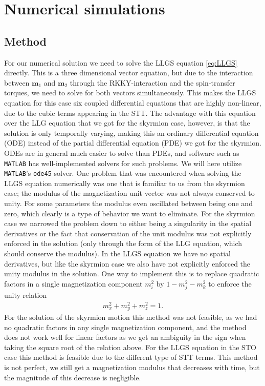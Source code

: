 \section{Numerical simulations}
\subsection{Method}
For our numerical solution we need to solve the LLGS equation \eqref{eq:LLGS} directly. This is a three dimensional vector equation, but due to the interaction between $\mathbold{m}_1$ and $\mathbold{m}_2$ through the RKKY-interaction and the spin-transfer torques, we need to solve for both vectors simultaneously. This makes the LLGS equation for this case six coupled differential equations that are highly non-linear, due to the cubic terms appearing in the STT. The advantage with this equation over the LLG equation that we got for the skyrmion case, however, is that the solution is only temporally varying, making this an ordinary differential equation (ODE) instead of the partial differential equation (PDE) we got for the skyrmion. ODEs are in general much easier to solve than PDEs, and software such as \texttt{MATLAB} has well-implemented solvers for such problems. We will here utilize \texttt{MATLAB}'s \texttt{ode45} solver. One problem that was encountered when solving the LLGS equation numerically was one that is familiar to us from the skyrmion case; the modulus of the magnetization unit vector was not always conserved to unity. For some parameters the modulus even oscillated between being one and zero, which clearly is a type of behavior we want to eliminate. For the skyrmion case we narrowed the problem down to either being a singularity in the spatial derivatives or the fact that conservation of the unit modulus was not explicitly enforced in the solution (only through the form of the LLG equation, which should conserve the modulus). In the LLGS equation we have no spatial derivatives, but like the skyrmion case we also have not explicitly enforced the unity modulus in the solution. One way to implement this is to replace quadratic factors in a single magnetization component $m_i^2$ by $1-m_j^2-m_k^2$ to enforce the unity relation
\begin{align}
    m_x^2+m_y^2+m_z^2=1.
\end{align}
For the solution of the skyrmion motion this method was not feasible, as we had no quadratic factors in any single magnetization component, and the method does not work well for linear factors as we get an ambiguity in the sign when taking the square root of the relation above. For the LLGS equation in the STO case this method is feasible due to the different type of STT terms. This method is not perfect, we still get a magnetization modulus that decreases with time, but the magnitude of this decrease is negligible.

